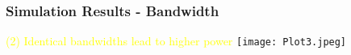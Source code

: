 \documentclass[10pt,dvipsnames,table]{beamer}
\DeclarePairedDelimiter\ceil{\lceil}{\rceil}
\begin{document}
\begin{frame}
\frametitle{Simulation Results - Bandwidth}
\textcolor{yellow}{(2) Identical bandwidths lead to higher power}
\pause
\texttt{[image: Plot3.jpeg]}
\end{frame}






\end{document}
